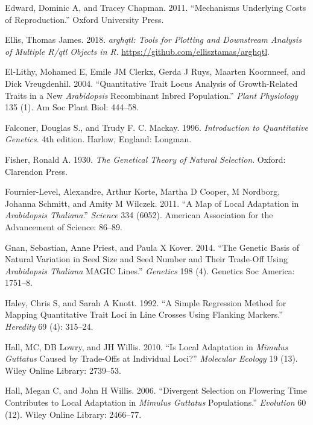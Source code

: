 \documentclass[]{article}
\begin{document}
\leavevmode\hypertarget{ref-edward2011mechanisms}{}%
Edward, Dominic A, and Tracey Chapman. 2011. ``Mechanisms Underlying Costs of Reproduction.'' Oxford University Press.

\leavevmode\hypertarget{ref-ellis_arghqtl}{}%
Ellis, Thomas James. 2018. \emph{\textup{arghqtl}: Tools for Plotting and Downstream Analysis of Multiple R/qtl Objects in R}. \url{https://github.com/ellisztamas/arghqtl}.

\leavevmode\hypertarget{ref-el2004quantitative}{}%
El-Lithy, Mohamed E, Emile JM Clerkx, Gerda J Ruys, Maarten Koornneef, and Dick Vreugdenhil. 2004. ``Quantitative Trait Locus Analysis of Growth-Related Traits in a New \emph{Arabidopsis} Recombinant Inbred Population.'' \emph{Plant Physiology} 135 (1). Am Soc Plant Biol: 444--58.

\leavevmode\hypertarget{ref-Falconer1996}{}%
Falconer, Douglas S., and Trudy F. C. Mackay. 1996. \emph{Introduction to Quantitative Genetics}. 4th edition. Harlow, England: Longman.

\leavevmode\hypertarget{ref-Fisher1930}{}%
Fisher, Ronald A. 1930. \emph{The Genetical Theory of Natural Selection}. Oxford: Clarendon Press.

\leavevmode\hypertarget{ref-fournier2011map}{}%
Fournier-Level, Alexandre, Arthur Korte, Martha D Cooper, M Nordborg, Johanna Schmitt, and Amity M Wilczek. 2011. ``A Map of Local Adaptation in \emph{Arabidopsis Thaliana}.'' \emph{Science} 334 (6052). American Association for the Advancement of Science: 86--89.

\leavevmode\hypertarget{ref-gnan2014genetic}{}%
Gnan, Sebastian, Anne Priest, and Paula X Kover. 2014. ``The Genetic Basis of Natural Variation in Seed Size and Seed Number and Their Trade-Off Using \emph{Arabidopsis Thaliana} MAGIC Lines.'' \emph{Genetics} 198 (4). Genetics Soc America: 1751--8.

\leavevmode\hypertarget{ref-Haley1992}{}%
Haley, Chris S, and Sarah A Knott. 1992. ``A Simple Regression Method for Mapping Quantitative Trait Loci in Line Crosses Using Flanking Markers.'' \emph{Heredity} 69 (4): 315--24.

\leavevmode\hypertarget{ref-Hall2010}{}%
Hall, MC, DB Lowry, and JH Willis. 2010. ``Is Local Adaptation in \emph{Mimulus Guttatus} Caused by Trade-Offs at Individual Loci?'' \emph{Molecular Ecology} 19 (13). Wiley Online Library: 2739--53.

\leavevmode\hypertarget{ref-Hall2006}{}%
Hall, Megan C, and John H Willis. 2006. ``Divergent Selection on Flowering Time Contributes to Local Adaptation in \emph{Mimulus Guttatus} Populations.'' \emph{Evolution} 60 (12). Wiley Online Library: 2466--77.
\end{document}
